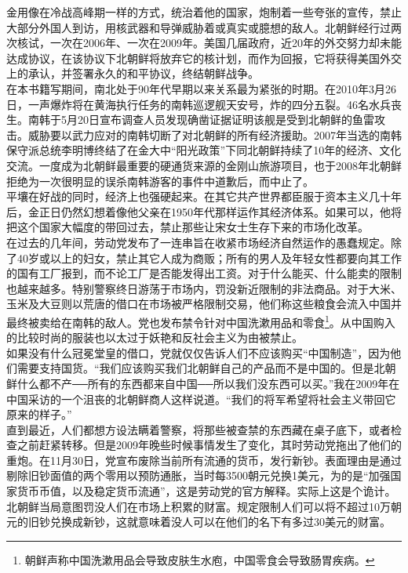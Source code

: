 金用像在冷战高峰期一样的方式，统治着他的国家，炮制着一些夸张的宣传，禁止大部分外国人到访，用核武器和导弹威胁着或真实或臆想的敌人。北朝鲜经行过两次核试，一次在2006年、一次在2009年。美国几届政府，近20年的外交努力却未能达成协议，在该协议下北朝鲜将放弃它的核计划，而作为回报，它将获得美国外交上的承认，并签署永久的和平协议，终结朝鲜战争。\\

在本书籍写期间，南北处于90年代早期以来关系最为紧张的时期。在2010年3月26日，一声爆炸将在黄海执行任务的南韩巡逻舰天安号，炸的四分五裂。46名水兵丧生。南韩于5月20日宣布调查人员发现确凿证据证明该舰是受到北朝鲜的鱼雷攻击。威胁要以武力应对的南韩切断了对北朝鲜的所有经济援助。2007年当选的南韩保守派总统李明博终结了在金大中“阳光政策”下同北朝鲜持续了10年的经济、文化交流。一度成为北朝鲜最重要的硬通货来源的金刚山旅游项目，也于2008年北朝鲜拒绝为一次很明显的误杀南韩游客的事件中道歉后，而中止了。\\

平壤在好战的同时，经济上也强硬起来。在其它共产世界都臣服于资本主义几十年后，金正日仍然幻想着像他父亲在1950年代那样运作其经济体系。如果可以，他将把这个国家大幅度的带回过去，禁止那些让宋女士生存下来的市场化改革。\\

在过去的几年间，劳动党发布了一连串旨在收紧市场经济自然运作的愚蠢规定。除了40岁或以上的妇女，禁止其它人成为商贩；所有的男人及年轻女性都要向其工作的国有工厂报到，而不论工厂是否能发得出工资。对于什么能买、什么能卖的限制也越来越多。特别警察终日游荡于市场内，罚没新近限制的非法商品。对于大米、玉米及大豆则以荒唐的借口在市场被严格限制交易，他们称这些粮食会流入中国并最终被卖给在南韩的敌人。党也发布禁令针对中国洗漱用品和零食\footnote{朝鲜声称中国洗漱用品会导致皮肤生水庖，中国零食会导致肠胃疾病。}。从中国购入的比较时尚的服装也以太过于妖艳和反社会主义为由被禁止。\\

如果没有什么冠冕堂皇的借口，党就仅仅告诉人们不应该购买“中国制造”，因为他们需要支持国货。“我们应该购买我们北朝鲜自己的产品而不是中国的。但是北朝鲜什么都不产──所有的东西都来自中国──所以我们没东西可以买。”我在2009年在中国采访的一个沮丧的北朝鲜商人这样说道。“我们的将军希望将社会主义带回它原来的样子。”\\

直到最近，人们都想方设法瞒着警察，将那些被查禁的东西藏在桌子底下，或者检查之前赶紧转移。但是2009年晚些时候事情发生了变化，其时劳动党拖出了他们的重炮。在11月30日，党宣布废除当前所有流通的货币，发行新钞。表面理由是通过剔除旧钞面值的两个零用以预防通胀，当时每3500朝元兑换1美元，为的是“加强国家货币币值，以及稳定货币流通”，这是劳动党的官方解释。实际上这是个诡计。北朝鲜当局意图罚没人们在市场上积累的财富。规定限制人们可以将不超过10万朝元的旧钞兑换成新钞，这就意味着没人可以在他们的名下有多过30美元的财富。\\

